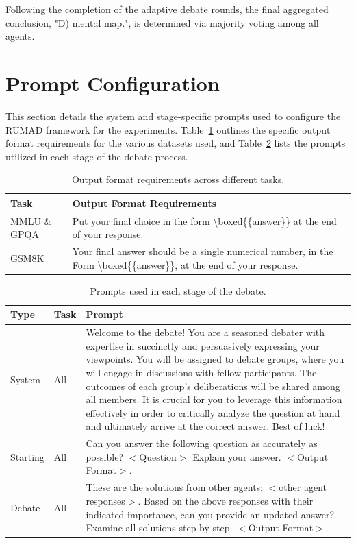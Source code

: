 Following the completion of the adaptive debate rounds, the final aggregated conclusion, "D) mental map.", is determined via majority voting among all agents.

\section{Prompt Configuration}

This section details the system and stage-specific prompts used to configure the RUMAD framework for the experiments. Table~\ref{tab:output_format} outlines the specific output format requirements for the various datasets used, and Table~\ref{tab:prompt} lists the prompts utilized in each stage of the debate process.

\begin{table}[h]
    \centering
    \caption{Output format requirements across different tasks.}
    \begin{tabularx}{\columnwidth}{l X}
        \toprule
        \textbf{Task} & \textbf{Output Format Requirements} \\
        \midrule     
        MMLU \& GPQA & Put your final choice in the form \textbackslash boxed\{\{answer\}\} at the end of your response. \\
        \midrule
        GSM8K & Your final answer should be a single numerical number, in the Form \textbackslash boxed\{\{answer\}\}, at the end of your response. \\
        \bottomrule
    \end{tabularx}
    \label{tab:output_format}
\end{table}

\begin{table}[h]
    \centering
    \caption{Prompts used in each stage of the debate.}
    \begin{tabularx}{\textwidth}{l l X}
        \toprule
        \textbf{Type} & \textbf{Task} & \textbf{Prompt} \\
        \midrule
        System & All & Welcome to the debate! You are a seasoned debater with expertise in succinctly and persuasively expressing your viewpoints. You will be assigned to debate groups, where you will engage in discussions with fellow participants. The outcomes of each group's deliberations will be shared among all members. It is crucial for you to leverage this information effectively in order to critically analyze the question at hand and ultimately arrive at the correct answer. Best of luck! \\
        \midrule
        Starting & All & Can you answer the following question as accurately as possible? $<$Question$>$ Explain your answer. $<$Output Format$>$. \\
        \midrule     
        Debate & All & These are the solutions from other agents: $<$other agent responses$>$. Based on the above responses with their indicated importance, can you provide an updated answer? Examine all solutions step by step. $<$Output Format$>$. \\
        \bottomrule
    \end{tabularx}
    \label{tab:prompt}
\end{table}
